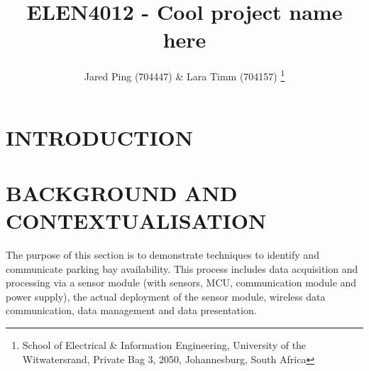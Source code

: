 \documentclass[10pt,twocolumn]{witseiepaper}
\begin{document}
	
	
\title{ELEN4012 - Cool project name here}
	
\author{Jared Ping (704447) \& Lara Timm (704157)
	\thanks{School of Electrical \& Information Engineering, University of the
			Witwatersrand, Private Bag 3, 2050, Johannesburg, South Africa}
}
	
\abstract{}
	
\keywords{}
	
\maketitle
\section{INTRODUCTION}




\section{BACKGROUND AND CONTEXTUALISATION}
	The purpose of this section is to demonstrate techniques to identify and communicate parking bay availability. This process includes data acquisition and processing via a sensor module (with sensors, MCU, communication module and power supply), the actual deployment of the sensor module, wireless data communication, data management and data presentation. 
\end{document}
